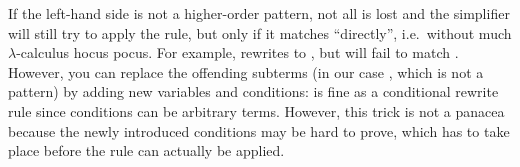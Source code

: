 \begin{isabellebody}
\begin{isamarkuptext}
If the left-hand side is not a higher-order pattern, not all is lost
and the simplifier will still try to apply the rule, but only if it
matches ``directly'', i.e.\ without much $\lambda$-calculus hocus
pocus. For example,  rewrites
 to , but will fail to match
.  However, you can
replace the offending subterms (in our case , which
is not a pattern) by adding new variables and conditions:  is fine
as a conditional rewrite rule since conditions can be arbitrary
terms. However, this trick is not a panacea because the newly
introduced conditions may be hard to prove, which has to take place
before the rule can actually be applied.
  

\end{isamarkuptext}
\end{isabellebody}
